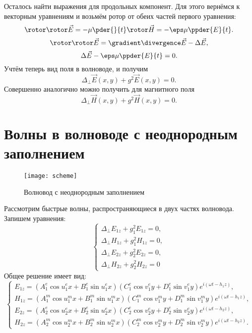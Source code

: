 \documentclass[12pt]{hedsemwork}
\begin{document}
    Осталось найти выражения для продольных компонент. Для этого вернёмся к
    векторным уравнениям и возьмём ротор от обеих частей первого уравнения:
    \[
        \rotor\rotor\vec{E} = -\mu \pder{}{t}\rotor\vec{H} =
        -\eps\mu\ppder{E}{t}.
    \]
    \[
        \rotor\rotor\vec{E} = \gradient\divergence\vec{E} - \Delta\vec{E},
    \]
    \[
        \Delta\vec{E} - \eps\mu\ppder{E}{t} = 0.
    \]
    Учтём теперь вид поля в волноводе, и получим
    \[
        \Delta_\perp \vec{E}(x,y) + g^2\vec{E}(x,y) = 0.
    \]
    Совершенно аналогично можно получить для магнитного поля
    \[
        \Delta_\perp \vec{H}(x,y) + g^2\vec{H}(x,y) = 0.
    \]

\section{Волны в волноводе с неоднородным заполнением}
\begin{figure}[h]
    \center
    \texttt{[image: scheme]}
    \caption{Волновод с неоднородным заполнением}
\end{figure}
    Рассмотрим быстрые волны, распространяющиеся в двух частях волновода.
    Запишем уравнения:
    \[
        \left\{
        \begin{array}{l}
            \Delta_\perp E_{1z} + g_1^2 E_{1z} = 0,\\
            \Delta_\perp H_{1z} + g_1^2 H_{1z} = 0,\\
            \Delta_\perp E_{2z} + g_2^2 E_{2z} = 0,\\
            \Delta_\perp H_{2z} + g_2^2 H_{2z} = 0
        \end{array}
        \right.
    \]
    Общее решение имеет вид:
    \[
        \left\{
        \begin{array}{l}
            E_{1z} =
            (A^e_1\cos u^e_1 x + B^e_1\sin u^e_1 x)
            (C^e_1\cos v^e_1 y + D^e_1\sin v^e_1 y)
            e^{i(\omega t - h_1 z)}, \\
            H_{1z} =
            (A^m_1\cos u^m_1 x + B^m_1\sin u^m_1 x)
            (C^m_1\cos v^m_1 y + D^m_1\sin v^m_1 y)
            e^{i(\omega t - h_1 z)}, \\
            E_{2z} =
            (A^e_2\cos u^e_2 x + B^e_2\sin u^e_2 x)
            (C^e_2\cos v^e_2 y + D^e_2\sin v^e_2 y)
            e^{i(\omega t - h_2 z)}, \\
            H_{2z} =
            (A^m_2\cos u^m_2 x + B^m_2\sin u^m_2 x)
            (C^m_2\cos v^m_2 y + D^m_2\sin v^m_2 y)
            e^{i(\omega t - h_2 z)}.
        \end{array}
        \right.
    \]
\end{document}
